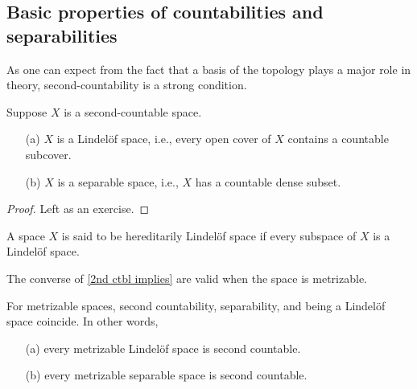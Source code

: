 \subsection{Basic properties of countabilities and separabilities}
As one can expect from the fact that a basis of the topology plays a major role in theory, second-countability is a strong condition.
\begin{prop}\label{2nd ctbl implies}
    Suppose $X$ is a second-countable space.
    \begin{enumerate}
        \item[(a)]
        {
            $X$ is a Lindel\"of space, i.e., every open cover of $X$ contains a countable subcover.
        }
        \item[(b)]
        {
            $X$ is a separable space, i.e., $X$ has a countable dense subset.
        }
    \end{enumerate}
\end{prop}
\begin{proof}
    \color{brown}Left as an exercise.\color{black}
\end{proof}
\begin{rmk}
    A space $X$ is said to be hereditarily Lindel\"of space if every subspace of $X$ is a Lindel\"of space.
\end{rmk}
The converse of \cref{2nd ctbl implies} are valid when the space is metrizable.
\begin{prop}
    For metrizable spaces, second countability, separability, and being a Lindel\"{o}f space coincide.
    In other words,
    \begin{enumerate}
        \item[(a)]
        {
            every metrizable Lindel\"{o}f space is second countable.
        }
        \item[(b)]
        {
            every metrizable separable space is second countable.
        }
    \end{enumerate}
\end{prop}
